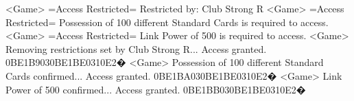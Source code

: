 <Game> =Access Restricted= Restricted by: Club Strong R 
<Game> =Access Restricted= Possession of 100 different 
Standard Cards is required to access. 
<Game> =Access Restricted= Link Power of 500 is required to access. 
<Game> Removing restrictions set by Club Strong R... Access granted. 
{0B}{E1}{B9}{03}{0B}{E1}{BE}{03}{10}{E2}�
<Game> Possession of 100 different Standard Cards confirmed... Access granted. 
{0B}{E1}{BA}{03}{0B}{E1}{BE}{03}{10}{E2}�
<Game> Link Power of 500 confirmed... Access granted. 
{0B}{E1}{BB}{03}{0B}{E1}{BE}{03}{10}{E2}�
